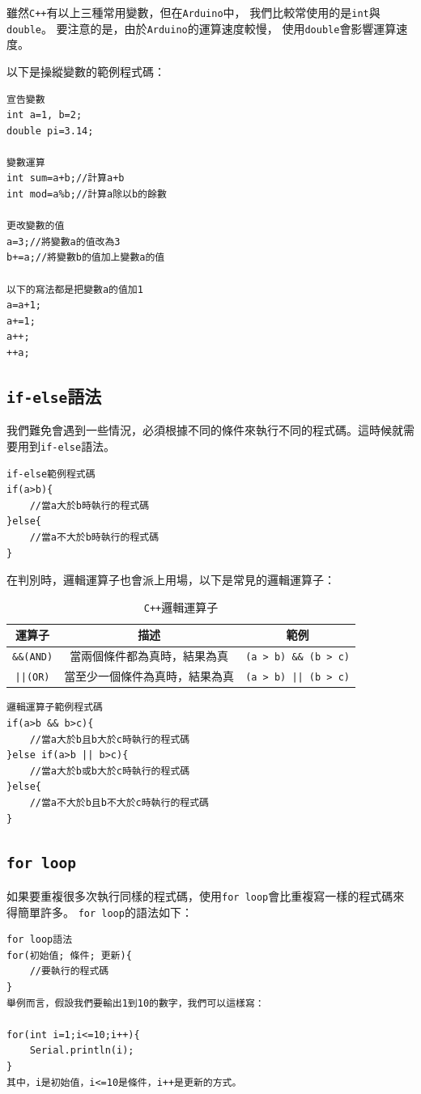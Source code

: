 \documentclass[12pt,a4paper]{article}
\begin{document}
雖然\texttt{C++}有以上三種常用變數，但在\texttt{Arduino}中，
我們比較常使用的是\texttt{int}與\texttt{double}。
要注意的是，由於\texttt{Arduino}的運算速度較慢，
使用\texttt{double}會影響運算速度。

以下是操縱變數的範例程式碼：

\begin{lstlisting}
宣告變數
int a=1, b=2;
double pi=3.14;

變數運算
int sum=a+b;//計算a+b
int mod=a%b;//計算a除以b的餘數

更改變數的值
a=3;//將變數a的值改為3
b+=a;//將變數b的值加上變數a的值

以下的寫法都是把變數a的值加1
a=a+1;
a+=1;
a++;
++a;
\end{lstlisting}
    
\subsection{\texttt{if-else}語法}
我們難免會遇到一些情況，必須根據不同的條件來執行不同的程式碼。這時候就需要用到\texttt{if-else}語法。


\begin{lstlisting}
if-else範例程式碼
if(a>b){
    //當a大於b時執行的程式碼
}else{
    //當a不大於b時執行的程式碼
}
\end{lstlisting}

在判別時，邏輯運算子也會派上用場，以下是常見的邏輯運算子：
\begin{table}[h!]
\centering
\begin{tabular}{|c|c|c|}
\hline
\textbf{運算子} & \textbf{描述} & \textbf{範例} \\ \hline
\texttt{\&\&(AND)}  & 當兩個條件都為真時，結果為真 & \texttt{(a > b) \&\& (b > c)} \\ \hline
\texttt{||(OR)}  & 當至少一個條件為真時，結果為真 & \texttt{(a > b) || (b > c)} \\ \hline
\end{tabular}
\caption{\texttt{C++}邏輯運算子}
\label{tab:logical_bitwise_operators}
\end{table}

\begin{lstlisting}
邏輯運算子範例程式碼
if(a>b && b>c){
    //當a大於b且b大於c時執行的程式碼
}else if(a>b || b>c){
    //當a大於b或b大於c時執行的程式碼
}else{
    //當a不大於b且b不大於c時執行的程式碼
}
\end{lstlisting}

\subsection{\texttt{for loop}}
如果要重複很多次執行同樣的程式碼，使用\texttt{for loop}會比重複寫一樣的程式碼來得簡單許多。
\texttt{for loop}的語法如下：
\begin{lstlisting}
for loop語法
for(初始值; 條件; 更新){
    //要執行的程式碼
}
舉例而言，假設我們要輸出1到10的數字，我們可以這樣寫：

for(int i=1;i<=10;i++){
    Serial.println(i);
}
其中，i是初始值，i<=10是條件，i++是更新的方式。
\end{lstlisting}
\end{document}
